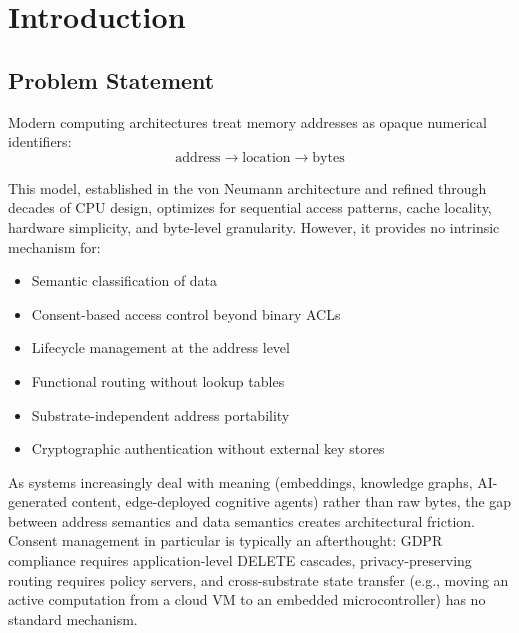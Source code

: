 \documentclass[11pt,a4paper]{article}
\begin{document}
\vspace{1em}
\noindent{}

\tableofcontents
\newpage

\section{Introduction}

\subsection{Problem Statement}

Modern computing architectures treat memory addresses as opaque numerical identifiers:
\begin{equation}
\text{address} \rightarrow \text{location} \rightarrow \text{bytes}
\end{equation}

This model, established in the von Neumann architecture and refined through decades of CPU design, optimizes for sequential access patterns, cache locality, hardware simplicity, and byte-level granularity. However, it provides no intrinsic mechanism for:

\begin{itemize}
    \item Semantic classification of data
    \item Consent-based access control beyond binary ACLs
    \item Lifecycle management at the address level
    \item Functional routing without lookup tables
    \item Substrate-independent address portability
    \item Cryptographic authentication without external key stores
\end{itemize}

As systems increasingly deal with meaning (embeddings, knowledge graphs, AI-generated content, edge-deployed cognitive agents) rather than raw bytes, the gap between address semantics and data semantics creates architectural friction. Consent management in particular is typically an afterthought: GDPR compliance requires application-level DELETE cascades, privacy-preserving routing requires policy servers, and cross-substrate state transfer (e.g., moving an active computation from a cloud VM to an embedded microcontroller) has no standard mechanism.
\end{document}
